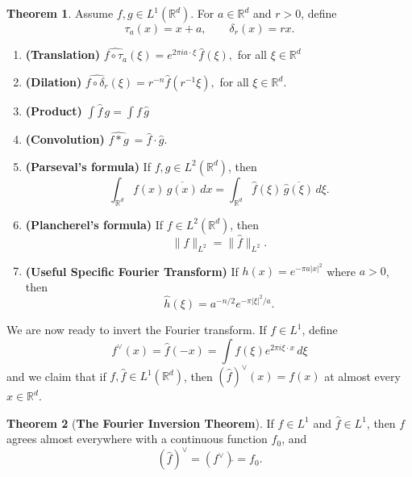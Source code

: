 \documentclass[12pt,a4paper]{report}
\theoremstyle{definition}
\newtheorem{theorem}{Theorem}
\begin{document}
\begin{theorem} \label{thm:fourier-properties}
Assume \( f, g \in L^1(\mathbb{R}^d) \). For $a \in \mathbb{R}^d$ and $r > 0$, define
$$
\tau_a(x) = x + a, \qquad \delta_r(x) = r x.
$$
\begin{enumerate}[label=\alph*.]
    \item \textbf{(Translation)}
    $\widehat{f \circ \tau_a}(\xi) = e^{2\pi i a \cdot \xi} \, \widehat{f}(\xi),$ \hspace{0.07cm} for all $\xi \in \mathbb{R}^d$
    \item \label{dilation} \textbf{(Dilation)} $\widehat{f \circ \delta_r}(\xi) = r^{-n} \widehat{f}(r^{-1} \xi),$ \hspace{0.07cm} for all $\xi \in \mathbb{R}^d$.
    \item \textbf{(Product)} \label{product} $\int \widehat{f} \, g = \int f \, \widehat{g}$
    \item \textbf{(Convolution)} \label{convolution} \( \widehat{f * g}\ = \widehat{f} \cdot \widehat{g} \).
    \item \label{parseval} \textbf{(Parseval's formula)} If \( f, g \in L^2(\mathbb{R}^d) \), then
    \[
    \int_{\mathbb{R}^d} f(x) \, \overline{g(x)} \, dx = \int_{\mathbb{R}^d} \widehat{f}(\xi) \, \overline{\widehat{g}(\xi)} \, d\xi.
    \]
    \item \label{planch} \textbf{(Plancherel's formula)} If \( f \in L^2(\mathbb{R}^d) \), then
    \[
    \|f\|_{L^2} = \|\widehat{f}\|_{L^2}.
    \]
    \item \label{usefulFT}  \textbf{(Useful Specific Fourier Transform)}
    If \( h(x) = e^{-\pi a |x|^2} \) where \( a > 0 \), then
    \[
    \widehat{h}(\xi) = a^{-n/2} e^{-\pi |\xi|^2 / a}.
    \]
\end{enumerate}
\end{theorem}

We are now ready to invert the Fourier transform. If \( f \in L^1 \), define $$ f^\vee(x) = \widehat{f} (-x) = \int f(\xi) e^{2\pi i \xi \cdot x} \, d\xi$$ and we claim that if $f, \widehat{f} \in L^1(\mathbb{R}^d)$, then $ (\widehat{f})^\vee (x) = f(x)$ at almost every $x \in \mathbb{R}^d$.

\begin{theorem}[\textbf{The Fourier Inversion Theorem}]
If \( f \in L^1 \) and \( \widehat{f} \in L^1 \), then \( f \) agrees almost everywhere with a continuous function \( f_0 \), and
\[
\left( \widehat{f} \right)^\vee = \left( f^\vee \right)\widehat{} = f_0.
\]
\end{theorem}
\end{document}
